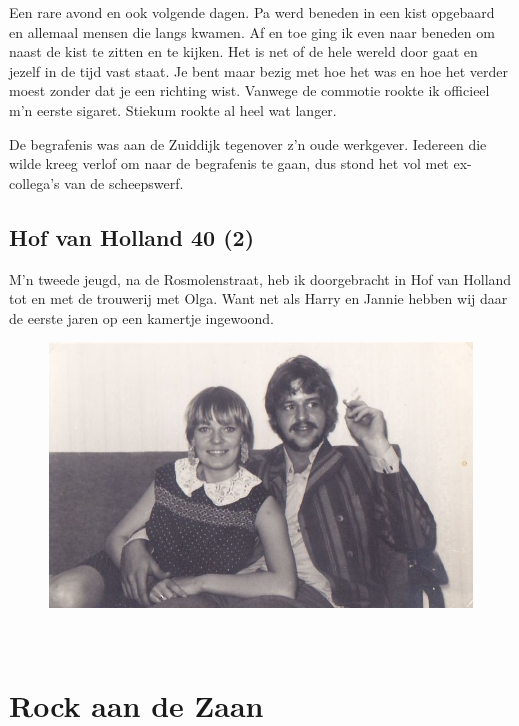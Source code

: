 \documentclass[10pt,twoside, openright]{memoir}
\begin{document}
Een rare avond en ook volgende dagen. Pa werd beneden in een kist opgebaard en allemaal mensen die langs kwamen. Af en toe ging ik even naar beneden om naast de kist te zitten en te kijken. Het is net of de hele wereld door gaat en jezelf in de tijd vast staat. Je bent maar bezig met hoe het was en hoe het verder moest zonder dat je een richting wist. Vanwege de commotie rookte ik officieel m’n eerste sigaret. Stiekum rookte al heel wat langer.

De begrafenis was aan de Zuiddijk tegenover z’n oude werkgever. Iedereen die wilde kreeg verlof om naar de begrafenis te gaan, dus stond het vol met ex-collega’s van de scheepswerf. 

\chapter{Hof van Holland 40 (2)} %
\label{cha:hofvanholland2}

M’n tweede jeugd, na de Rosmolenstraat, heb ik doorgebracht in Hof van Holland tot en met de trouwerij met Olga. Want net als Harry en Jannie hebben wij daar de eerste jaren op een kamertje ingewoond.

\begin{figure}[h]
\includegraphics[width=\textwidth]{img/ch22/joho_0001}
\end{figure}

\clearpage
~
\clearpage
\part{Rock aan de Zaan}
\end{document}
